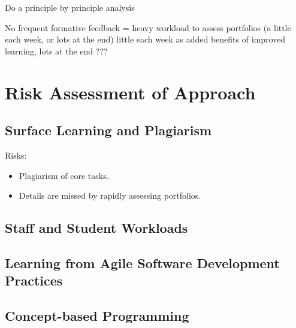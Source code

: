 Do a principle by principle analysis

No frequent formative feedback = heavy workload to assess portfolios (a little each week, or lots at the end) little each week as added benefits of improved learning, lots at the end ???


\section{Risk Assessment of Approach} %
\label{sec:risk_assessment_of_approach}



\subsection{Surface Learning and Plagiarism} %
\label{sub:surface_learning_and_plagiarism}

Risks:
\begin{itemize}[noitemsep,nolistsep]
	\item Plagiarism of core tasks.
	\item Details are missed by rapidly assessing portfolios.
\end{itemize}


\subsection{Staff and Student Workloads} %
\label{sub:staff_and_student_workloads}








\subsection{Learning from Agile Software Development Practices} %
\label{sub:learning_from_agile_software_development_practices}


\subsection{Concept-based Programming} %
\label{sub:concept_based_programming}


